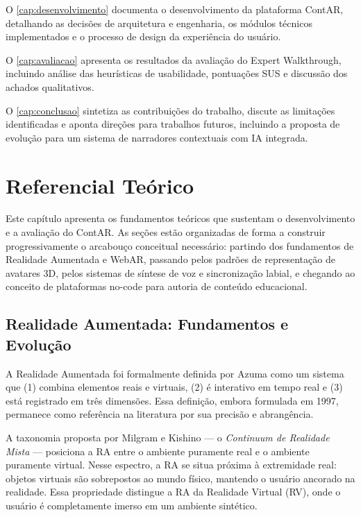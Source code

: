 \documentclass[
  12pt,
  openright,
  twoside,
  a4paper,
  english,
  brazil
]{abntex2}
\begin{document}
O \autoref{cap:desenvolvimento} documenta o desenvolvimento da plataforma
ContAR, detalhando as decisões de arquitetura e engenharia, os módulos
técnicos implementados e o processo de design da experiência do usuário.

O \autoref{cap:avaliacao} apresenta os resultados da avaliação do Expert
Walkthrough, incluindo análise das heurísticas de usabilidade, pontuações
SUS e discussão dos achados qualitativos.

O \autoref{cap:conclusao} sintetiza as contribuições do trabalho, discute
as limitações identificadas e aponta direções para trabalhos futuros,
incluindo a proposta de evolução para um sistema de narradores contextuais
com IA integrada.


\chapter{Referencial Teórico}
\label{cap:referencial}

Este capítulo apresenta os fundamentos teóricos que sustentam o desenvolvimento
e a avaliação do ContAR. As seções estão organizadas de forma a construir
progressivamente o arcabouço conceitual necessário: partindo dos fundamentos
de Realidade Aumentada e WebAR, passando pelos padrões de representação de
avatares 3D, pelos sistemas de síntese de voz e sincronização labial, e
chegando ao conceito de plataformas no-code para autoria de conteúdo educacional.

\section{Realidade Aumentada: Fundamentos e Evolução}
\label{sec:ra-fundamentos}

A Realidade Aumentada foi formalmente definida por Azuma \cite{azuma1997}
como um sistema que (1) combina elementos reais e virtuais, (2) é interativo
em tempo real e (3) está registrado em três dimensões. Essa definição,
embora formulada em 1997, permanece como referência na literatura por sua
precisão e abrangência.

A taxonomia proposta por Milgram e Kishino \cite{milgram1994} — o
\textit{Continuum de Realidade Mista} — posiciona a RA entre o ambiente
puramente real e o ambiente puramente virtual. Nesse espectro, a RA
se situa próxima à extremidade real: objetos virtuais são sobrepostos
ao mundo físico, mantendo o usuário ancorado na realidade. Essa propriedade
distingue a RA da Realidade Virtual (RV), onde o usuário é completamente
imerso em um ambiente sintético.
\end{document}

